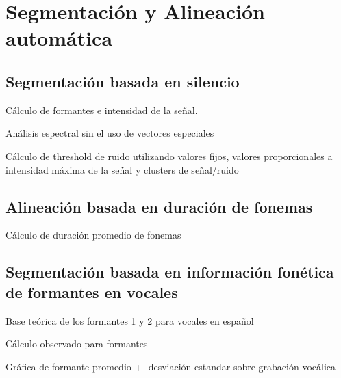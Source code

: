 \documentclass[a4paper,12pt,twoside]{report}
\begin{document}
\chapter{Segmentación y Alineación automática}

\section{Segmentación basada en silencio}

Cálculo de formantes e intensidad de la señal.

Análisis espectral sin el uso de vectores especiales

Cálculo de threshold de ruido utilizando valores fijos, valores proporcionales a intensidad máxima de la señal y clusters de señal/ruido

\section{Alineación basada en duración de fonemas}

Cálculo de duración promedio de fonemas



\section{Segmentación basada en información fonética de formantes en vocales}

Base teórica de los formantes 1 y 2 para vocales en español

Cálculo observado para formantes 

Gráfica de formante promedio +- desviación estandar sobre grabación vocálica


% 
% 

\end{document}
